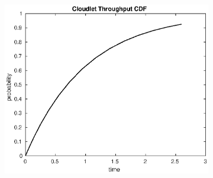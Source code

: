 \begin{frame}
\begin{figure}[!h]
\begin{subfigure}[t]{0.49\textwidth}
\label{15_intperc}
\end{subfigure}
%
\begin{subfigure}[t]{0.49\textwidth}
\includegraphics[width=\textwidth]{../figures/thrclet_cdf}
\label{thrclet_cdf}
\end{subfigure}
\end{figure}
\end{frame}
